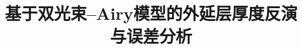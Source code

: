 \documentclass[withoutpreface]{cumcmthesis}
\title{基于双光束–Airy模型的外延层厚度反演与误差分析}
\begin{document}
\maketitle
\let\AbstractCheckNewPage\newpage
\let\AbstractCheckNull\null
\let\newpage\relax
\let\null\relax
\begin{abstract}

\end{abstract}
\let\newpage\AbstractCheckNewPage
\let\null\AbstractCheckNull
\end{document}
